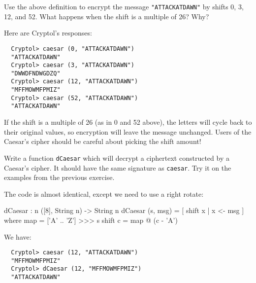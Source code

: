 \begin{Exercise}\label{ex:caesar:1}
  Use the above definition to encrypt the message {\tt "ATTACKATDAWN"}
  by shifts 0, 3, 12, and 52. What happens when the shift is a
  multiple of 26? Why?
\end{Exercise}
\begin{Answer}
Here are Cryptol's responses:
\begin{Verbatim}
  Cryptol> caesar (0, "ATTACKATDAWN")
  "ATTACKATDAWN"
  Cryptol> caesar (3, "ATTACKATDAWN")
  "DWWDFNDWGDZQ"
  Cryptol> caesar (12, "ATTACKATDAWN")
  "MFFMOWMFPMIZ"
  Cryptol> caesar (52, "ATTACKATDAWN")
  "ATTACKATDAWN"
\end{Verbatim}
If the shift is a multiple of 26 (as in 0 and 52 above), the letters
will cycle back to their original values, so encryption will leave the
message unchanged. Users of the Caesar's cipher should be careful
about picking the shift amount!
\end{Answer}

\begin{Exercise}\label{ex:caesar:2}
  Write a function {\tt dCaesar} which will decrypt a ciphertext
  constructed by a Caesar's cipher. It should have the same signature
  as {\tt caesar}.  Try it on the examples from the previous exercise.
\end{Exercise}
\begin{Answer}
  The code is almost identical, except we need to use a right
  rotate:\indRotRight

\begin{code}
  dCaesar : {n} ([8], String n) -> String n
  dCaesar (s, msg) = [ shift x | x <- msg ]
        where map     = ['A' .. 'Z'] >>> s
              shift c = map @ (c - 'A')
\end{code}
We have:
\begin{Verbatim}
  Cryptol> caesar (12, "ATTACKATDAWN")
  "MFFMOWMFPMIZ"
  Cryptol> dCaesar (12, "MFFMOWMFPMIZ")
  "ATTACKATDAWN"
\end{Verbatim}
\end{Answer}

